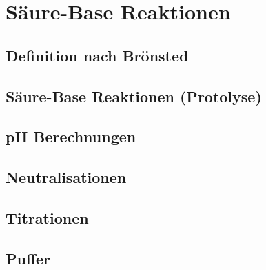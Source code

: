 \section{Säure-Base Reaktionen}

\subsection{Definition nach Brönsted}

\subsection{Säure-Base Reaktionen (Protolyse)}

\subsection{pH Berechnungen}

\subsection{Neutralisationen}

\subsection{Titrationen}

\subsection{Puffer}